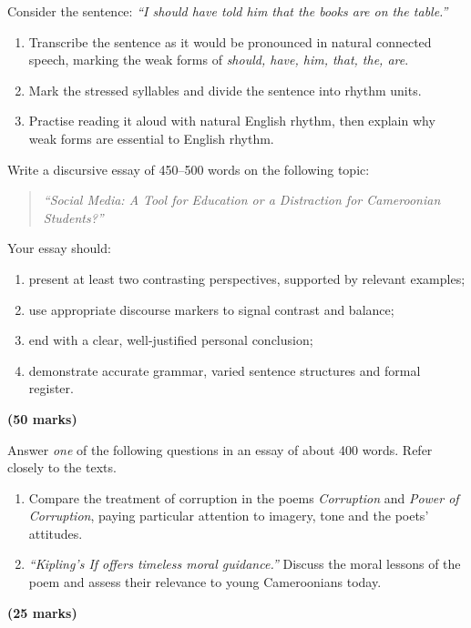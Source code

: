 \documentclass[11pt]{article}
\newcounter{popsec}
\newcounter{popsub}
\newcommand{\courssub}[1]{%
  \stepcounter{popsub}%
  \par\vspace{9pt}\noindent{\popxbold\fontsize{11.5}{13}\selectfont\color{popink}{\color{poporange}\thepopsec.\thepopsub}\hspace{6pt}#1}\par\nopagebreak\vspace{4pt}
}
\begin{document}
\begin{exercice}
Consider the sentence: \emph{``I should have told him that the books are on the table.''}
\begin{enumerate}
\item Transcribe the sentence as it would be pronounced in natural connected speech, marking the weak forms of \emph{should, have, him, that, the, are}.
\item Mark the stressed syllables and divide the sentence into rhythm units.
\item Practise reading it aloud with natural English rhythm, then explain why weak forms are essential to English rhythm.
\end{enumerate}
\end{exercice}

\courssub{I prepare for the GCE}

\begin{exercice}
Write a discursive essay of 450--500 words on the following topic:
\begin{quote}
\emph{``Social Media: A Tool for Education or a Distraction for Cameroonian Students?''}
\end{quote}
Your essay should:
\begin{enumerate}
\item present at least two contrasting perspectives, supported by relevant examples;
\item use appropriate discourse markers to signal contrast and balance;
\item end with a clear, well-justified personal conclusion;
\item demonstrate accurate grammar, varied sentence structures and formal register.
\end{enumerate}
\textbf{(50 marks)}
\end{exercice}

\begin{exercice}
Answer \emph{one} of the following questions in an essay of about 400 words. Refer closely to the texts.
\begin{enumerate}
\item Compare the treatment of corruption in the poems \emph{Corruption} and \emph{Power of Corruption}, paying particular attention to imagery, tone and the poets' attitudes.
\item \emph{``Kipling's \emph{If} offers timeless moral guidance.''} Discuss the moral lessons of the poem and assess their relevance to young Cameroonians today.
\end{enumerate}
\textbf{(25 marks)}
\end{exercice}
\end{document}
